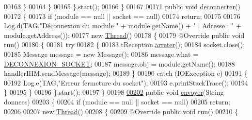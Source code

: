 \begin{DoxyCode}
00163                 \}
00164             \}
00165         \}.start();
00166     \}
00167 
\hyperlink{classcom_1_1example_1_1area_1_1_liaison_bluetooth_a10b356586feed95ecacb0a57cb51f0e6}{00171}     \textcolor{keyword}{public} \textcolor{keywordtype}{void} \hyperlink{classcom_1_1example_1_1area_1_1_liaison_bluetooth_a10b356586feed95ecacb0a57cb51f0e6}{deconnecter}()
00172     \{
00173         \textcolor{keywordflow}{if} (module == null || socket == null)
00174             \textcolor{keywordflow}{return};
00175 
00176         Log.d(TAG,\textcolor{stringliteral}{"Déconnexion du module "} + module.getName() + \textcolor{stringliteral}{" | Adresse : "} + module.getAddress());
00177         \textcolor{keyword}{new} \hyperlink{class_thread}{Thread}()
00178         \{
00179             @Override \textcolor{keyword}{public} \textcolor{keywordtype}{void} run()
00180             \{
00181                 \textcolor{keywordflow}{try}
00182                 \{
00183                     tReception.\hyperlink{classcom_1_1example_1_1area_1_1_liaison_bluetooth_1_1_t_reception_a89f97f22a976b8632e82b2aa94ab2674}{arreter}();
00184                     socket.close();
00185                     Message message = \textcolor{keyword}{new} Message();
00186                     message.what = \hyperlink{classcom_1_1example_1_1area_1_1_liaison_bluetooth_a8ff08468d7b2cead9c3714c665f75d0e}{DECONNEXION\_SOCKET};
00187                     message.obj = module.getName();
00188                     handlerIHM.sendMessage(message);
00189                 \}
00190                 \textcolor{keywordflow}{catch} (IOException e)
00191                 \{
00192                     Log.e(TAG,\textcolor{stringliteral}{"Erreur fermeture du socket"});
00193                     e.printStackTrace();
00194                 \}
00195             \}
00196         \}.start();
00197     \}
00198 
\hyperlink{classcom_1_1example_1_1area_1_1_liaison_bluetooth_a67360b2f673b47b8a552a9e789a93fce}{00202}     \textcolor{keyword}{public} \textcolor{keywordtype}{void} \hyperlink{classcom_1_1example_1_1area_1_1_liaison_bluetooth_a67360b2f673b47b8a552a9e789a93fce}{envoyer}(String donnees)
00203     \{
00204         \textcolor{keywordflow}{if} (module == null || socket == null)
00205             \textcolor{keywordflow}{return};
00206 
00207         \textcolor{keyword}{new} \hyperlink{class_thread}{Thread}()
00208         \{
00209             @Override \textcolor{keyword}{public} \textcolor{keywordtype}{void} run()
00210             \{

\end{DoxyCode}
